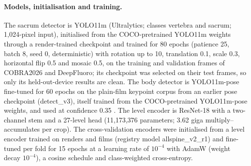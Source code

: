 \paragraph{Models, initialisation and training.}
The sacrum detector is YOLO11m (Ultralytics; classes vertebra and sacrum; 1,024-pixel input), initialised from the
COCO-pretrained YOLO11m weights through a render-trained checkpoint and trained for 80 epochs (patience 25, batch
8, seed 0, deterministic) with rotation up to 10\textdegree, translation 0.1, scale 0.3, horizontal flip 0.5 and
mosaic 0.5, on the training and validation frames of COBRA2026 and DeepFluoro; its checkpoint was selected on
their test frames, so only its held-out-device results are clean.
The body detector is YOLO11m-pose fine-tuned for 60 epochs on the plain-film keypoint corpus from an earlier pose
checkpoint (detect\_v3), itself trained from the COCO-pretrained YOLO11m-pose weights, and used at confidence 0.35
.
The level encoder is ResNet-18 with a two-channel stem and a 27-level head (11,173,376 parameters; 3.62 giga
multiply--accumulates per crop). The cross-validation encoders were initialised from a level encoder trained on
renders and films (registry model allspine\_v2\_r1) and fine-tuned per fold for 15 epochs at a learning rate of
$10^{-4}$ with AdamW (weight decay $10^{-4}$), a cosine schedule and class-weighted cross-entropy.
